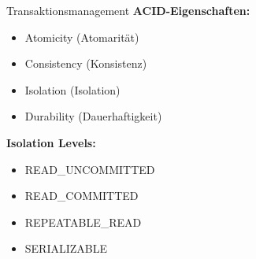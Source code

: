 
\begin{concept}{Transaktionsmanagement}
\textbf{ACID-Eigenschaften:}
\begin{itemize}
    \item Atomicity (Atomarität)
    \item Consistency (Konsistenz)
    \item Isolation (Isolation)
    \item Durability (Dauerhaftigkeit)
\end{itemize}

\textbf{Isolation Levels:}
\begin{itemize}
    \item READ\_UNCOMMITTED
    \item READ\_COMMITTED
    \item REPEATABLE\_READ
    \item SERIALIZABLE
\end{itemize}
\end{concept}